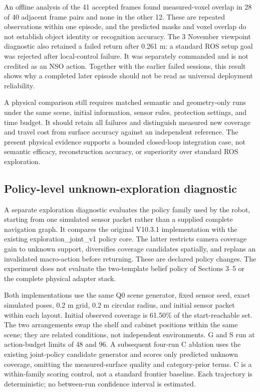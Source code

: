 \documentclass[11pt,a4paper]{article}
\begin{document}
An offline analysis of the 41 accepted frames found measured-voxel overlap in 28 of 40 adjacent frame pairs and none in the other 12. These are repeated observations within one episode, and the predicted masks and voxel overlap do not establish object identity or recognition accuracy. The 3 November viewpoint diagnostic also retained a failed return after 0.261 m: a standard ROS setup goal was rejected after local-control failure. It was separately commanded and is not credited as an NSO action. Together with the earlier failed sessions, this result shows why a completed later episode should not be read as universal deployment reliability.

A physical comparison still requires matched semantic and geometry-only runs under the same scene, initial information, sensor rules, protection settings, and time budget. It should retain all failures and distinguish measured new coverage and travel cost from surface accuracy against an independent reference. The present physical evidence supports a bounded closed-loop integration case, not semantic efficacy, reconstruction accuracy, or superiority over standard ROS exploration.

\subsection{Policy-level unknown-exploration diagnostic}\label{unknown-exploration-diagnostic}

A separate exploration diagnostic evaluates the policy family used by
the robot, starting from one simulated sensor packet rather than a
supplied complete navigation graph. It compares the original V10.3.1
implementation with the existing exploration\_joint\_v1 policy core. The
latter restricts camera coverage gain to unknown support, diversifies
coverage candidates spatially, and replans an invalidated macro-action
before returning. These are declared policy changes. The experiment does
not evaluate the two-template belief policy of Sections 3--5 or the
complete physical adapter stack.


Both implementations use the same Q0 scene generator, fixed sensor seed,
exact simulated poses, 0.2 m grid, 0.2 m circular radius, and initial
sensor packet within each layout. Initial observed coverage is 61.50\%
of the start-reachable set. The two arrangements swap the shelf and
cabinet positions within the same scene; they are related conditions,
not independent environments. G and S run at action-budget limits of 48
and 96. A subsequent four-run C ablation uses the existing joint-policy
candidate generator and scores only predicted unknown coverage, omitting
the measured-surface quality and category-prior terms. C is a
within-family scoring control, not a standard frontier baseline. Each
trajectory is deterministic; no between-run confidence interval is
estimated.
\end{document}
